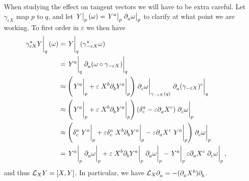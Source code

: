 When studying the effect on tangent vectors we will have to be extra careful. Let $\gamma_{\varepsilon X}$ map $p$ to $q$, and let $\eval{Y}_{p}(\omega) = \eval{Y^{a}}_{p}\eval{\del{}{a}{\omega}}_{p}$ to clarify at what point we are working. To first order in $\varepsilon$ we then have
\begin{align*}
	\eval{\pub{\gamma_{\varepsilon X}}{Y}}_{q}(\omega) &= \eval{Y}_{q}(\pub{\gamma_{-\varepsilon X}}{\omega}) \\
	                                                   &= \eval{Y^{a}}_{q}\eval{\del{}{a}{(\omega\circ\gamma_{-\varepsilon X})}}_{q} \\
	                                                   &\approx \left(\eval{Y^{a}}_{p} + \varepsilon\eval{ X^{b}\del{}{b}{Y^{a}}}_{p}\right) \eval{\del{}{c}{\omega}}_{\gamma_{-\varepsilon X}(q)}\eval{\del{}{a}{(\gamma_{-\varepsilon X})^{c}}}_{q} \\
	                                                   &\approx \left(\eval{Y^{a}}_{p} + \varepsilon\eval{ X^{b}\del{}{b}{Y^{a}}}_{p}\right) \left(\kdelta{a}{c} - \varepsilon\del{}{a}{X^{c}}\right)\eval{\del{}{c}{\omega}}_{p} \\
	                                                   &\approx \left(\kdelta{a}{c}\eval{Y^{a}}_{p} + \varepsilon\kdelta{a}{c}\eval{ X^{b}\del{}{b}{Y^{a}}}_{p} - \varepsilon\del{}{a}{X^{c}}\eval{Y^{a}}_{p}\right)\eval{\del{}{c}{\omega}}_{p} \\
	                                                   &= \eval{Y^{a}}_{p}\eval{\del{}{a}{\omega}}_{p} + \varepsilon\eval{ X^{b}\del{}{b}{Y^{a}}}_{p}\eval{\del{}{a}{\omega}}_{p} - \eval{Y^{a}}_{p}\varepsilon\del{}{a}{X^{c}}\eval{\del{}{c}{\omega}}_{p},
\end{align*}
and thus $\lied{X}{Y} = \comm{X}{Y}$. In particular, we have $\mathcal{L}_{X}\partial^{}_{a}{} = -(\partial^{}_{a}{X^{b}})\partial^{}_{b}{}$.


